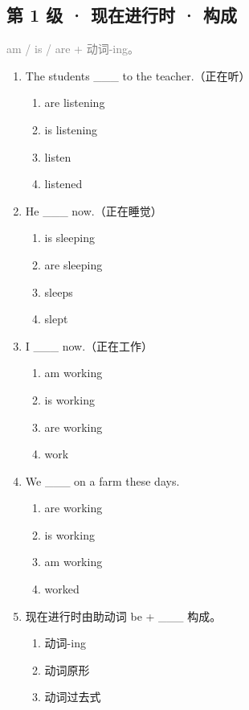 \documentclass[11pt,a4paper]{ctexart}
\begin{document}
\subsection*{第 1 级 · 现在进行时 · 构成}
\noindent\textcolor{gray}{am / is / are + 动词-ing。}\par\smallskip
\begin{enumerate}[leftmargin=*,itemsep=4pt]
\item The students \_\_\_ to the teacher.（正在听）
\begin{enumerate}[label=\Alph*.,leftmargin=2em,itemsep=1pt,topsep=2pt]
\item are listening
\item is listening
\item listen
\item listened
\end{enumerate}
\item He \_\_\_ now.（正在睡觉）
\begin{enumerate}[label=\Alph*.,leftmargin=2em,itemsep=1pt,topsep=2pt]
\item is sleeping
\item are sleeping
\item sleeps
\item slept
\end{enumerate}
\item I \_\_\_ now.（正在工作）
\begin{enumerate}[label=\Alph*.,leftmargin=2em,itemsep=1pt,topsep=2pt]
\item am working
\item is working
\item are working
\item work
\end{enumerate}
\item We \_\_\_ on a farm these days.
\begin{enumerate}[label=\Alph*.,leftmargin=2em,itemsep=1pt,topsep=2pt]
\item are working
\item is working
\item am working
\item worked
\end{enumerate}
\item 现在进行时由助动词 be + \_\_\_ 构成。
\begin{enumerate}[label=\Alph*.,leftmargin=2em,itemsep=1pt,topsep=2pt]
\item 动词-ing
\item 动词原形
\item 动词过去式

\end{enumerate}
\end{enumerate}
\end{document}
